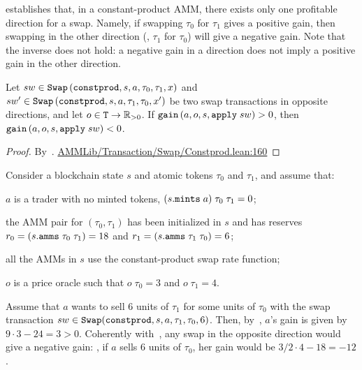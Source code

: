  establishes that, in a constant-product AMM, there exists only one profitable direction for a swap. Namely, if swapping $\tau_0$ for $\tau_1$ gives a positive gain, then swapping in the other direction (\ie, $\tau_1$ for $\tau_0$) will give a negative gain.
Note that the inverse does not hold: a negative gain in a direction does not imply a positive gain in the other direction. 
\begin{lemma}
\label{th:swapdirection}
Let $sw \in \code{Swap}\left(\code{constprod},s,a,\tau_0,\tau_1,x\right)$ and $sw' \in \code{Swap}\left(\code{constprod},s,a,\tau_1,\tau_0,x'\right)$ be two swap transactions in opposite directions, and let $o \in \code{T} \to \mathbb R_{>0}$.
If $\code{gain}\left(a, o, s, \code{apply}\; sw\right) > 0$, then $\code{gain}\left(a, o, s, \code{apply}\; sw\right) < 0$.
\end{lemma}
\begin{proof}
By~. \href{https://github.com/danielepusceddu/lean4-amm/blob/paper/AMMLib/Transaction/Swap/Constprod.lean#L160}{AMMLib/Transaction/Swap/Constprod.lean:160}
\end{proof}

\begin{example}
\label{ex:results:swapdirection}
Consider a blockchain state $s$ and atomic tokens $\tau_0$ and $\tau_1$, and assume that: \begin{inlinelist}
\item $a$ is a trader with no minted tokens, \ie $(s\code{.mints}\;a)\;\tau_0\;\tau_1 = 0$;
\item the AMM pair for $(\tau_0, \tau_1)$ has been initialized in $s$ and has reserves $r_0 = (s\code{.amms}\;\tau_0\;\tau_1) = 18$ and $r_1 = (s\code{.amms}\;\tau_1\;\tau_0) = 6$;
\item all the AMMs in $s$ use the constant-product swap rate function;
\item $o$ is a price oracle such that $o\;\tau_0 = 3$ and $o\;\tau_1 = 4$.
\end{inlinelist}
Assume that $a$ wants to sell 6 units of $\tau_1$ for some units of $\tau_0$ with the swap transaction $sw \in \code{Swap}(\code{constprod}, s, a, \tau_1, \tau_0, 6)$. Then, by~, $a$'s gain is given by $9\cdot 3 - 24 = 3 > 0$.
Coherently with~, any swap in the opposite direction would give a negative gain: \eg, if $a$ sells 6 units of $\tau_0$, her gain would be $3/2 \cdot 4 - 18 = -12$. 
\end{example}

